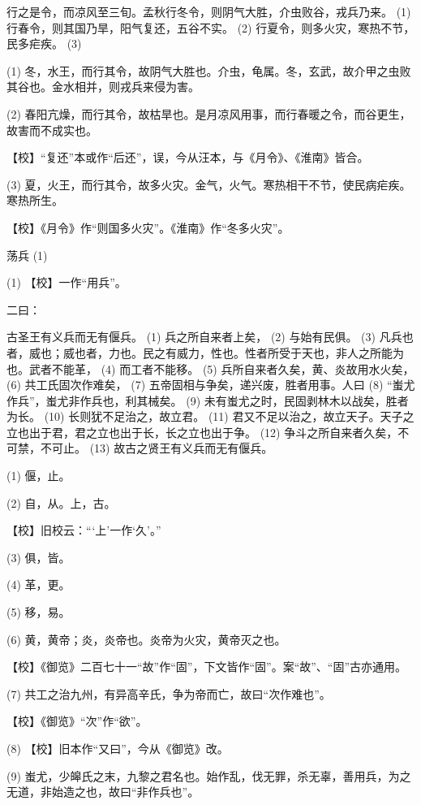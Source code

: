 \documentclass[12pt,UTF8]{ctexbook}
\begin{document}
行之是令，而凉风至三旬。孟秋行冬令，则阴气大胜，介虫败谷，戎兵乃来。 (1) 行春令，则其国乃旱，阳气复还，五谷不实。 (2) 行夏令，则多火灾，寒热不节，民多疟疾。 (3)

(1) 冬，水王，而行其令，故阴气大胜也。介虫，龟属。冬，玄武，故介甲之虫败其谷也。金水相并，则戎兵来侵为害。

(2) 春阳亢燥，而行其令，故枯旱也。是月凉风用事，而行春暖之令，而谷更生，故害而不成实也。

【校】“复还”本或作“后还”，误，今从汪本，与《月令》、《淮南》皆合。

(3) 夏，火王，而行其令，故多火灾。金气，火气。寒热相干不节，使民病疟疾。寒热所生。

【校】《月令》作“则国多火灾”。《淮南》作“冬多火灾”。





荡兵 (1)


(1) 【校】一作“用兵”。

二曰：

古圣王有义兵而无有偃兵。 (1) 兵之所自来者上矣， (2) 与始有民俱。 (3) 凡兵也者，威也；威也者，力也。民之有威力，性也。性者所受于天也，非人之所能为也。武者不能革， (4) 而工者不能移。 (5) 兵所自来者久矣，黄、炎故用水火矣， (6) 共工氏固次作难矣， (7) 五帝固相与争矣，递兴废，胜者用事。人曰 (8) “蚩尤作兵”，蚩尤非作兵也，利其械矣。 (9) 未有蚩尤之时，民固剥林木以战矣，胜者为长。 (10) 长则犹不足治之，故立君。 (11) 君又不足以治之，故立天子。天子之立也出于君，君之立也出于长，长之立也出于争。 (12) 争斗之所自来者久矣，不可禁，不可止。 (13) 故古之贤王有义兵而无有偃兵。

(1) 偃，止。

(2) 自，从。上，古。

【校】旧校云：“‘上’一作‘久’。”

(3) 俱，皆。

(4) 革，更。

(5) 移，易。

(6) 黄，黄帝；炎，炎帝也。炎帝为火灾，黄帝灭之也。

【校】《御览》二百七十一“故”作“固”，下文皆作“固”。案“故”、“固”古亦通用。

(7) 共工之治九州，有异高辛氏，争为帝而亡，故曰“次作难也”。

【校】《御览》“次”作“欲”。

(8) 【校】旧本作“又曰”，今从《御览》改。

(9) 蚩尤，少皞氏之末，九黎之君名也。始作乱，伐无罪，杀无辜，善用兵，为之无道，非始造之也，故曰“非作兵也”。
\end{document}
